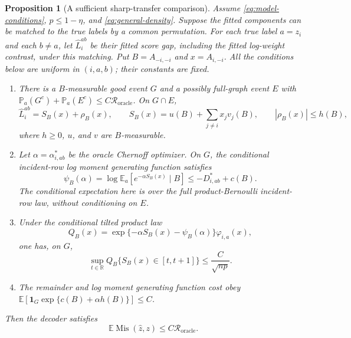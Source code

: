 \documentclass[11pt]{article}
\newtheorem{proposition}[theorem]{Proposition}
\theoremstyle{definition}
\theoremstyle{remark}
\newcommand{\Mis}{\operatorname{Mis}}
\newcommand{\E}{\mathbb E}
\newcommand{\PP}{\mathbb P}
\newcommand{\R}{\mathbb R}
\newcommand{\Roracle}{\mathcal R_{\mathrm{oracle}}}
\newcommand{\one}{\mathbf 1}
\numberwithin{equation}{section}
\begin{document}
\begin{proposition}[A sufficient sharp-transfer comparison]
\label{prop:general-sharp-transfer}
Assume \eqref{eq:model-conditions}, $p\le1-\eta$, and
\eqref{eq:general-density}. Suppose the fitted components can be matched
to the true labels by a common permutation. For each true label $a=z_i$
and each $b\ne a$, let $\widehat L_i^{ab}$ be their fitted score gap,
including the fitted log-weight contrast, under this matching. Put
$B=A_{-i,-i}$ and $x=A_{i,-i}$. All the conditions below are uniform in
$(i,a,b)$; their constants are fixed.
\begin{enumerate}[label=(\roman*)]
\item There is a $B$-measurable good event $G$ and a possibly
full-graph event $E$ with
$\PP_a(G^c)+\PP_a(E^c)\le C\Roracle$. On $G\cap E$,
\[
 \widehat L_i^{ab}=S_B(x)+\rho_B(x),\qquad
 S_B(x)=u(B)+\sum_{j\ne i}x_jv_j(B),\qquad
 |\rho_B(x)|\le h(B),
\]
where $h\ge0$, $u$, and $v$ are $B$-measurable.
\item Let $\alpha=\alpha^*_{i,ab}$ be the oracle Chernoff optimizer. On
$G$, the conditional incident-row log moment generating function satisfies
\[
 \psi_B(\alpha)=\log\E_a[e^{-\alpha S_B(x)}\mid B]
       \le-D^*_{i,ab}+c(B).
\]
The conditional expectation here is over the full product-Bernoulli
incident-row law, without conditioning on $E$.
\item Under the conditional tilted product law
\[
 Q_B(x)=\exp\{-\alpha S_B(x)-\psi_B(\alpha)\}
                 \varphi_{i,a}(x),
\]
one has, on $G$,
\[
 \sup_{t\in\R}Q_B\{S_B(x)\in[t,t+1]\}
       \le \frac{C}{\sqrt{np}}.
\]
\item The remainder and log moment generating function cost obey
$\E[\one_G\exp\{c(B)+\alpha h(B)\}]\le C$.
\end{enumerate}
Then the decoder satisfies
\begin{equation}
 \E\Mis(\widehat z,z)\le C\Roracle.
 \label{eq:general-conditional-rate}
\end{equation}
\end{proposition}
\end{document}

